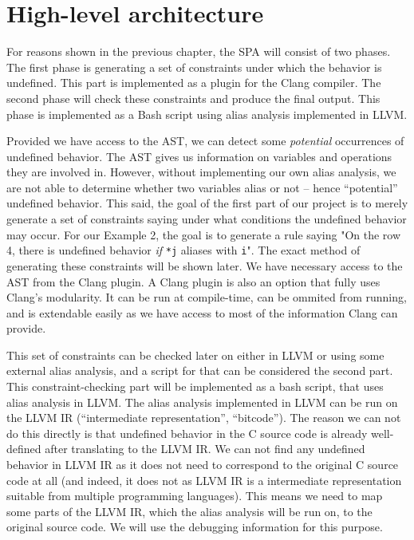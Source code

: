 \section{High-level architecture}
For reasons shown in the previous chapter, the SPA will consist of two phases. The first phase is generating a set of constraints under which the behavior is undefined. This part is implemented as a plugin for the Clang compiler. The second phase will check these constraints and produce the final output. This phase is implemented as a Bash script using alias analysis implemented in LLVM.

Provided we have access to the AST, we can detect some \emph{potential} occurrences of undefined behavior. The AST gives us information on variables and operations they are involved in. However, without implementing our own alias analysis, we are not able to determine whether two variables alias or not -- hence ``potential'' undefined behavior. This said, the goal of the first part of our project is to merely generate a set of constraints saying under what conditions the undefined behavior may occur. For our Example 2, the goal is to generate a rule saying "On the row 4, there is undefined behavior \emph{if} \verb|*j| aliases with \verb|i|". The exact method of generating these constraints will be shown later. We have necessary access to the AST from the Clang plugin. A Clang plugin is also an option that fully uses Clang's modularity. It can be run at compile-time, can be ommited from running, and is extendable easily as we have access to most of the information Clang can provide.

This set of constraints can be checked later on either in LLVM or using some external alias analysis, and a script for that can be considered the second part. This constraint-checking part will be implemented as a bash script, that uses alias analysis in LLVM. The alias analysis implemented in LLVM can be run on the LLVM IR (``intermediate representation'', ``bitcode''). The reason we can not do this directly is that undefined behavior in the C source code is already well-defined after translating to the LLVM IR. We can not find any undefined behavior in LLVM IR as it does not need to correspond to the original C source code at all (and indeed, it does not as LLVM IR is a intermediate representation suitable from multiple programming languages). This means we need to map some parts of the LLVM IR, which the alias analysis will be run on, to the original source code. We will use the debugging information for this purpose.

